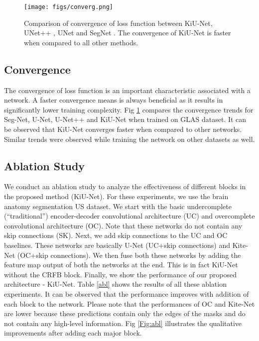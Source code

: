 \documentclass[journal,twoside,web]{ieeecolor}
\begin{document}
\begin{figure}[t]
	\centering
	\texttt{[image: figs/converg.png]}
	\caption{Comparison of convergence of loss function between KiU-Net, UNet++ \cite{zhou2018unet++}, UNet \cite{ronneberger2015u} and SegNet \cite{badrinarayanan2017segnet}. The convergence of KiU-Net is faster when compared to all other methods. }
	\label{convg}
\end{figure}






\subsection{Convergence}

The convergence of loss function is an important characteristic associated with a network.  A faster convergence means is always beneficial as it results in significantly lower training complexity. Fig \ref{convg} compares the convergence trends for Seg-Net, U-Net, U-Net++ and KiU-Net when trained on GLAS dataset. It can be observed that KiU-Net converges faster when compared to other networks. Similar trends were observed while training the network on other datasets as well. 



\subsection{Ablation Study}

We conduct an ablation study to analyze the effectiveness of different blocks   in the  proposed method (KiU-Net). For these experiments, we use the brain anatomy segmentation US dataset. We start with the basic undercomplete (``traditional'') encoder-decoder convolutional architecture (UC) and overcomplete convolutional architecture (OC). Note that these networks do not contain any    skip connections (SK). Next, we add skip connections to the UC and OC baselines. These networks are basically U-Net (UC+skip connections) and Kite-Net (OC+skip connections). We then fuse both these networks by adding the feature map output of both the networks at the end. This is in fact KiU-Net without the CRFB block. Finally, we show the performance of our proposed architecture - KiU-Net.  Table \ref{abl} shows the results of all these ablation experiments. It can be observed that the performance improves   with   addition of each block to the network. Please note that the performances of OC and Kite-Net are  lower because these predictions contain only the edges of the masks and do not contain any high-level information.  Fig \ref{Fig:abl} illustrates the qualitative improvements after adding each major block.  
\end{document}
